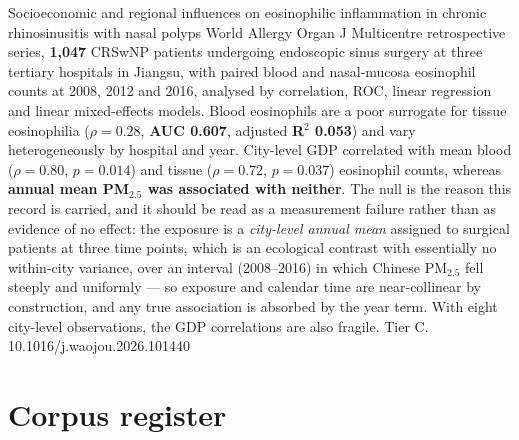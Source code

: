 \documentclass[10pt]{article}
\begin{document}

{Socioeconomic and regional influences on eosinophilic inflammation in chronic rhinosinusitis with nasal polyps}
{World Allergy Organ J}
{Multicentre retrospective series, \textbf{1,047} CRSwNP patients undergoing endoscopic
sinus surgery at three tertiary hospitals in Jiangsu, with paired blood and nasal-mucosa
eosinophil counts at 2008, 2012 and 2016, analysed by correlation, ROC, linear regression
and linear mixed-effects models. Blood eosinophils are a poor surrogate for tissue
eosinophilia (\textbf{$\rho=0.28$}, \textbf{AUC 0.607}, adjusted \textbf{R$^2$ 0.053}) and
vary heterogeneously by hospital and year. City-level GDP correlated with mean blood
($\rho=0.80$, $p=0.014$) and tissue ($\rho=0.72$, $p=0.037$) eosinophil counts, whereas
\textbf{annual mean PM$_{2.5}$ was associated with neither}. The null is the reason this
record is carried, and it should be read as a measurement failure rather than as evidence
of no effect: the exposure is a \emph{city-level annual mean} assigned to surgical
patients at three time points, which is an ecological contrast with essentially no
within-city variance, over an interval (2008--2016) in which Chinese PM$_{2.5}$ fell
steeply and uniformly --- so exposure and calendar time are near-collinear by
construction, and any true association is absorbed by the year term. With eight city-level
observations, the GDP correlations are also fragile. Tier C.}
{10.1016/j.waojou.2026.101440}

\clearpage

\section*{\sffamily\bfseries\color{Deep}Corpus register}
\vspace{-1.5mm}{\color{Amber}\rule{\linewidth}{1.1pt}}\vspace{2.5mm}


\end{document}
